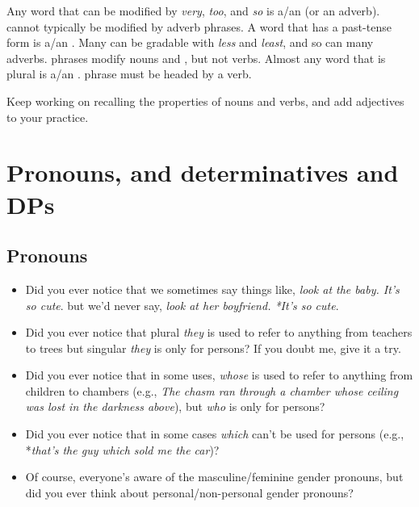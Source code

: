 \begin{tcolorbox}[title=Summary and review, colback=white]
    \phantom{zzz}Any word that can be modified by \textit{very}, \textit{too}, and \textit{so} is a/an \uline{\hspace{2cm}} (or an adverb).
    \uline{\hspace{2cm}} cannot typically be modified by adverb phrases. A word that has a past-tense form is a/an \uline{\hspace{2cm}}. Many \uline{\hspace{2cm}} can be gradable with \textit{less} and \textit{least}, and so can many adverbs.
    \uline{\hspace{2cm}} phrases modify nouns and \uline{\hspace{2cm}}, but not verbs. Almost any word that is plural is a/an \uline{\hspace{2cm}}.
    \uline{\hspace{2cm}} phrase must be headed by a verb.

    \phantom{a}

    \phantom{zzz}Keep working on recalling the properties of nouns and verbs, and add adjectives to your practice.
\end{tcolorbox}

\section{Pronouns, and determinatives and DPs}

\subsection{Pronouns}\label{sec:pronouns}
\begin{itemize}[noitemsep]
    \item Did you ever notice that we sometimes say things like, \textit{look at the baby. It's so cute}. but we'd never say, \textit{look at her boyfriend. *It's so cute}.
    \item Did you ever notice that plural \textit{they} is used to refer to anything from teachers to trees but singular \textit{they} is only for persons? If you doubt me, give it a try.
    \item Did you ever notice that in some uses, \textit{whose} is used to refer to anything from children to chambers (e.g., \textit{The chasm ran through a chamber whose ceiling was lost in the darkness above}), but \textit{who} is only for persons?
    \item Did you ever notice that in some cases \textit{which} can't be used for persons (e.g., *\textit{that's the guy which sold me the car})?
    \item Of course, everyone's aware of the masculine/feminine gender pronouns, but did you ever think about personal/non-personal gender pronouns?
\end{itemize}

